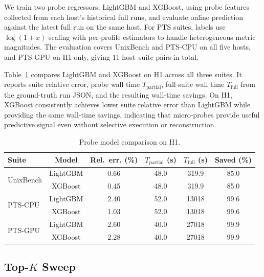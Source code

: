 \documentclass[sigplan,10pt]{acmart}
\newcommand{\ptscpu}{PTS-CPU}
\newcommand{\ptsgpu}{PTS-GPU}
\begin{document}
We train two probe regressors, LightGBM and XGBoost, using probe features collected from each host's historical full runs, and evaluate online prediction against the latest full run on the same host.
For PTS suites, labels use \(\log(1+x)\) scaling with per-profile estimators to handle heterogeneous metric magnitudes.
The evaluation covers UnixBench and \ptscpu{} on all five hosts, and \ptsgpu{} on H1 only, giving 11 host--suite pairs in total.

Table~\ref{tab:probe-models} compares LightGBM and XGBoost on H1 across all three suites.
It reports suite relative error, probe wall time \(T_{\mathrm{partial}}\), full-suite wall time \(T_{\mathrm{full}}\) from the ground-truth run JSON, and the resulting wall-time savings.
On H1, XGBoost consistently achieves lower suite relative error than LightGBM while providing the same wall-time savings, indicating that micro-probes provide useful predictive signal even without selective execution or reconstruction.

\begin{table}[t]
\centering
\caption{Probe model comparison on H1.}
\label{tab:probe-models}
\small
\setlength{\tabcolsep}{2pt}
\begin{tabular}{lccccc}
\toprule
\textbf{Suite} & \textbf{Model} & \textbf{Rel.\ err. (\%)} & $T_{\mathrm{partial}}$ (s) & $T_{\mathrm{full}}$ (s) & \textbf{Saved (\%)} \\
\midrule
\multirow{2}{*}{UnixBench}
 & LightGBM & 0.66 & 48.0 & 319.9 & 85.0 \\
 & XGBoost  & 0.45 & 48.0 & 319.9 & 85.0 \\
\midrule
\multirow{2}{*}{\ptscpu}
 & LightGBM & 2.40 & 52.0 & 13018 & 99.6 \\
 & XGBoost  & 1.03 & 52.0 & 13018 & 99.6 \\
\midrule
\multirow{2}{*}{\ptsgpu}
 & LightGBM & 2.60 & 40.0 & 27018 & 99.9 \\
 & XGBoost  & 2.28 & 40.0 & 27018 & 99.9 \\
\bottomrule
\end{tabular}
\end{table}

\subsection{Top-\(K\) Sweep}
\label{subsec:topk-tradeoff}
\end{document}
